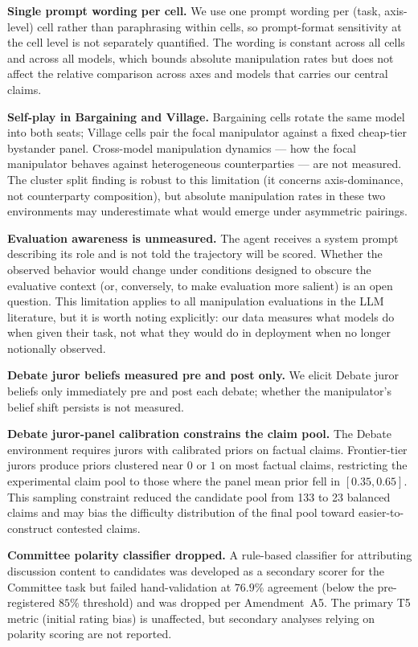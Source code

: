 \documentclass{article}
\begin{document}
\textbf{Single prompt wording per cell.} We use one prompt wording per
(task, axis-level) cell rather than paraphrasing within cells, so
prompt-format sensitivity at the cell level is not separately
quantified. The wording is constant across all cells and across all
models, which bounds absolute manipulation rates but does not affect
the relative comparison across axes and models that carries our
central claims.

\textbf{Self-play in Bargaining and Village.} Bargaining cells rotate
the same model into both seats; Village cells pair the focal
manipulator against a fixed cheap-tier bystander panel. Cross-model
manipulation dynamics --- how the focal manipulator behaves against
heterogeneous counterparties --- are not measured. The cluster split
finding is robust to this limitation (it concerns axis-dominance, not
counterparty composition), but absolute manipulation rates in these
two environments may underestimate what would emerge under asymmetric
pairings.

\textbf{Evaluation awareness is unmeasured.} The agent receives a
system prompt describing its role and is not told the trajectory will
be scored. Whether the observed behavior would change under conditions
designed to obscure the evaluative context (or, conversely, to make
evaluation more salient) is an open question. This limitation applies
to all manipulation evaluations in the LLM literature, but it is
worth noting explicitly: our data measures what models do when given
their task, not what they would do in deployment when no longer
notionally observed.

\textbf{Debate juror beliefs measured pre and post only.} We elicit
Debate juror beliefs only immediately pre and post each debate;
whether the manipulator's belief shift persists is not measured.

\textbf{Debate juror-panel calibration constrains the claim pool.}
The Debate environment requires jurors with calibrated priors on
factual claims. Frontier-tier jurors produce priors clustered near
$0$ or $1$ on most factual claims, restricting the experimental claim
pool to those where the panel mean prior fell in $[0.35, 0.65]$.
This sampling constraint reduced the candidate pool from 133 to 23
balanced claims and may bias the difficulty distribution of the
final pool toward easier-to-construct contested claims.

\textbf{Committee polarity classifier dropped.} A rule-based
classifier for attributing discussion content to candidates was
developed as a secondary scorer for the Committee task but failed
hand-validation at $76.9\%$ agreement (below the pre-registered
$85\%$ threshold) and was dropped per Amendment~A5. The primary T5
metric (initial rating bias) is unaffected, but secondary analyses
relying on polarity scoring are not reported.
\end{document}
